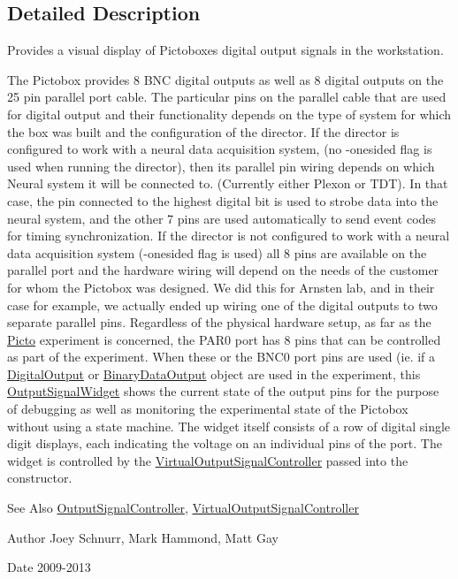 \subsection{Detailed Description}
Provides a visual display of Pictoboxes digital output signals in the workstation. 

The Pictobox provides 8 B\-N\-C digital outputs as well as 8 digital outputs on the 25 pin parallel port cable. The particular pins on the parallel cable that are used for digital output and their functionality depends on the type of system for which the box was built and the configuration of the director. If the director is configured to work with a neural data acquisition system, (no -\/onesided flag is used when running the director), then its parallel pin wiring depends on which Neural system it will be connected to. (Currently either Plexon or T\-D\-T). In that case, the pin connected to the highest digital bit is used to strobe data into the neural system, and the other 7 pins are used automatically to send event codes for timing synchronization. If the director is not configured to work with a neural data acquisition system (-\/onesided flag is used) all 8 pins are available on the parallel port and the hardware wiring will depend on the needs of the customer for whom the Pictobox was designed. We did this for Arnsten lab, and in their case for example, we actually ended up wiring one of the digital outputs to two separate parallel pins. Regardless of the physical hardware setup, as far as the \hyperlink{namespace_picto}{Picto} experiment is concerned, the P\-A\-R0 port has 8 pins that can be controlled as part of the experiment. When these or the B\-N\-C0 port pins are used (ie. if a \hyperlink{class_picto_1_1_digital_output}{Digital\-Output} or \hyperlink{class_picto_1_1_binary_data_output}{Binary\-Data\-Output} object are used in the experiment, this \hyperlink{class_picto_1_1_output_signal_widget}{Output\-Signal\-Widget} shows the current state of the output pins for the purpose of debugging as well as monitoring the experimental state of the Pictobox without using a state machine. The widget itself consists of a row of digital single digit displays, each indicating the voltage on an individual pins of the port. The widget is controlled by the \hyperlink{class_picto_1_1_virtual_output_signal_controller}{Virtual\-Output\-Signal\-Controller} passed into the constructor. \begin{DoxySeeAlso}{See Also}
\hyperlink{class_picto_1_1_output_signal_controller}{Output\-Signal\-Controller}, \hyperlink{class_picto_1_1_virtual_output_signal_controller}{Virtual\-Output\-Signal\-Controller} 
\end{DoxySeeAlso}
\begin{DoxyAuthor}{Author}
Joey Schnurr, Mark Hammond, Matt Gay 
\end{DoxyAuthor}
\begin{DoxyDate}{Date}
2009-\/2013 
\end{DoxyDate}


